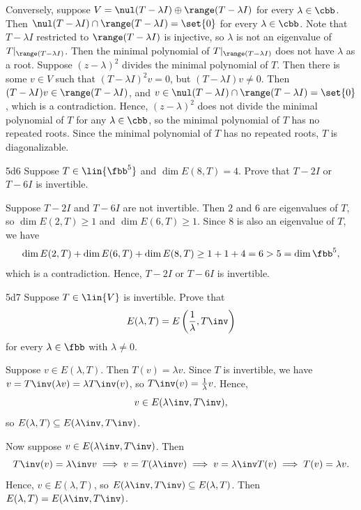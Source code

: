 \begin{sol}
    Conversely, suppose $V = \nul(T - \lambda I) \oplus \range(T - \lambda I)$ for every $\lambda \in \cbb$.
    Then $\nul(T - \lambda I) \cap \range(T - \lambda I) = \set{0}$ for every $\lambda \in \cbb$.
    Note that $T - \lambda I$ restricted to $\range(T - \lambda I)$ is injective, so $\lambda$ is not an eigenvalue of $T|_{\range(T - \lambda I)}$.
    Then the minimal polynomial of $T|_{\range(T - \lambda I)}$ does not have $\lambda$ as a root.
    Suppose $(z - \lambda)^2$ divides the minimal polynomial of $T$.
    Then there is some $v \in V$ such that $(T - \lambda I)^2v = 0$, but $(T - \lambda I)v \neq 0$.
    Then $(T - \lambda I)v \in \range(T - \lambda I)$, and $v \in \nul(T - \lambda I) \cap \range(T - \lambda I) = \set{0}$, which is a contradiction.
    Hence, $(z - \lambda)^2$ does not divide the minimal polynomial of $T$ for any $\lambda \in \cbb$, so the minimal polynomial of $T$ has no repeated roots.
    Since the minimal polynomial of $T$ has no repeated roots, $T$ is diagonalizable.
\end{sol}

\begin{exercise}{5d6}
    Suppose $T \in \lin{\fbb^5}$ and $\dim E(8, T) = 4$.
    Prove that $T - 2I$ or $T - 6I$ is invertible.
\end{exercise}

\begin{sol}
    Suppose $T - 2I$ and $T - 6I$ are not invertible.
    Then $2$ and $6$ are eigenvalues of $T$, so $\dim E(2, T) \geq 1$ and $\dim E(6, T) \geq 1$.
    Since $8$ is also an eigenvalue of $T$, we have
    \[
        \dim E(2, T) + \dim E(6, T) + \dim E(8, T) \geq 1 + 1 + 4 = 6 > 5 = \dim \fbb^5,
    \]
    which is a contradiction.
    Hence, $T - 2I$ or $T - 6I$ is invertible.
\end{sol}

\begin{exercise}{5d7}
    Suppose $T \in \lin{V}$ is invertible.
    Prove that
    \[
        E(\lambda, T) = E\left(\frac{1}{\lambda}, T\inv\right)
    \]
    for every $\lambda \in \fbb$ with $\lambda \neq 0$.
\end{exercise}

\begin{sol}
    Suppose $v \in E(\lambda, T)$.
    Then $T(v) = \lambda v$.
    Since $T$ is invertible, we have $v = T\inv(\lambda v) = \lambda T\inv(v)$, so $T\inv(v) = \frac{1}{\lambda} v$.
    Hence,
    \[
        v \in E(\lambda\inv, T\inv),
    \]
    so $E(\lambda, T) \subseteq E(\lambda\inv, T\inv)$.
    
    Now suppose $v \in E(\lambda\inv, T\inv)$.
    Then
    \[
        T\inv(v) = \lambda\inv v \implies v = T(\lambda\inv v) \implies v = \lambda\inv T(v) \implies T(v) = \lambda v.
    \]
    Hence, $v \in E(\lambda, T)$, so $E(\lambda\inv, T\inv) \subseteq E(\lambda, T)$.
    Then $E(\lambda, T) = E(\lambda\inv, T\inv)$.
\end{sol}

